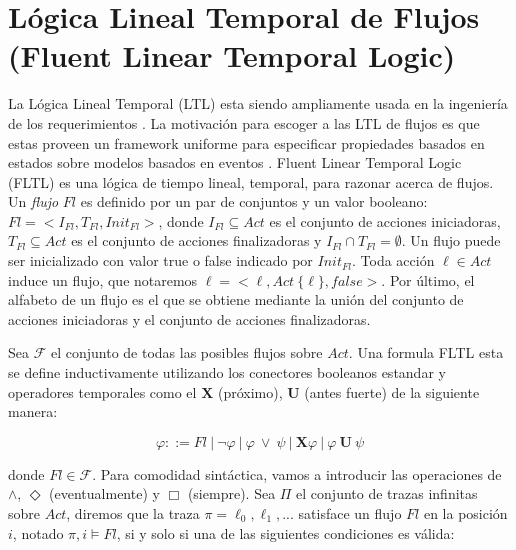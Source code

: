 \section{Lógica Lineal Temporal de Flujos (Fluent Linear Temporal Logic)}

La Lógica Lineal Temporal (LTL) esta siendo ampliamente usada en la ingeniería de los requerimientos
\cite{1347546,Giannakopoulou:2003:FMC:940071.940106,879820,Letier:2002:ATG:581339.581353}. La motivación para escoger a
las LTL de flujos es que estas proveen un framework uniforme para especificar propiedades basados en estados sobre
modelos basados en eventos \cite{Giannakopoulou:2003:FMC:940071.940106}. Fluent Linear Temporal Logic (FLTL) \cite{Giannakopoulou:2003:FMC:940071.940106}
es una lógica de tiempo lineal, temporal, para razonar acerca de flujos. Un \emph{flujo} $Fl$ es definido por un par de
conjuntos y un valor booleano: $Fl = <I_{Fl},T_{Fl},Init_{Fl}>$, donde $I_{Fl} \subseteq Act$ es el conjunto de acciones
iniciadoras, $T_{Fl} \subseteq Act$ es el conjunto de acciones finalizadoras y $I_{Fl} \cap T_{Fl} = \emptyset$. Un
flujo puede ser inicializado con valor true o false indicado por $Init_{Fl}$. Toda acción $\ell \in Act$ induce un flujo,
que notaremos $\ell = <\ell, Act \ \{\ell\}, false>$. Por último, el alfabeto de un flujo es el que se obtiene mediante la
unión del conjunto de acciones iniciadoras y el conjunto de acciones finalizadoras.

Sea $\mathcal{F}$ el conjunto de todas las posibles flujos sobre $Act$. Una formula FLTL esta se define inductivamente
utilizando los conectores booleanos estandar y operadores temporales como el $\mathbf{X}$ (próximo), $\mathbf{U}$ (antes
fuerte) de la
siguiente manera:

\begin{center}
\begin{equation}
    \varphi ::= Fl\ |\ \neg\varphi\ |\ \varphi\ \lor\ \psi\ |\ \mathbf{X} \varphi\ |\ \varphi\ \mathbf{U}\ \psi
\end{equation}
\end{center}

\noindent donde $Fl \in \mathcal{F}$. Para comodidad sintáctica, vamos a introducir las operaciones de $\land$,
$\Diamond$ (eventualmente) y $\Box$ (siempre). Sea $\Pi$ el conjunto de trazas infinitas sobre $Act$, diremos que la
traza $\pi = \ell_0,\ell_1,...$ satisface un flujo $Fl$ en la posición $i$, notado $\pi,i\vDash Fl$, si y solo si una de las
siguientes condiciones es válida:

